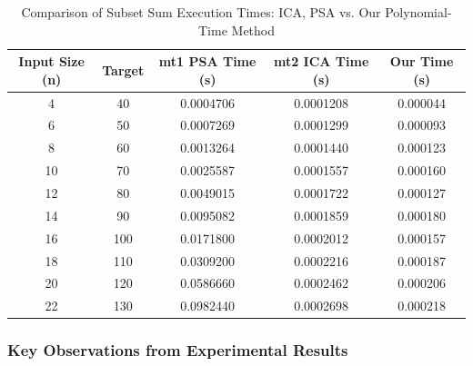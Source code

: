 \documentclass[11pt]{article}
\begin{document}
\begin{table}[H]
\centering
\begin{tabular}{|c|c|c|c|c|}
\hline
\textbf{Input Size (n)} & \textbf{Target} & \textbf{ mt1 PSA Time (s)} & \textbf{mt2 ICA Time (s)} & \textbf{Our Time (s)} \\
\hline
4  & 40  & 0.0004706 & 0.0001208 & 0.000044 \\
6  & 50  & 0.0007269 & 0.0001299 & 0.000093 \\
8  & 60  & 0.0013264 & 0.0001440 & 0.000123 \\
10 & 70  & 0.0025587 & 0.0001557 & 0.000160 \\
12 & 80  & 0.0049015 & 0.0001722 & 0.000127 \\
14 & 90  & 0.0095082 & 0.0001859 & 0.000180 \\
16 & 100 & 0.0171800 & 0.0002012 & 0.000157 \\
18 & 110 & 0.0309200 & 0.0002216 & 0.000187 \\
20 & 120 & 0.0586660 & 0.0002462 & 0.000206 \\
22 & 130 & 0.0982440 & 0.0002698 & 0.000218 \\

\hline
\end{tabular}
\caption{Comparison of Subset Sum Execution Times: ICA, PSA vs. Our Polynomial-Time Method}
\end{table}

\subsubsection*{Key Observations from Experimental Results}
\end{document}
